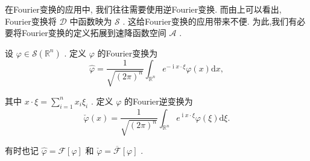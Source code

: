 \documentclass[lang=cn,newtx,10pt,scheme=chinese,thmcnt=chapter]{elegantbook}
\newcommand{\dif}{\mathrm{d}}
\newcommand{\ci}{\operatorname{i}}
\begin{document}
在Fourier变换的应用中, 我们往往需要使用逆Fourier变换. 而由上可以看出, Fourier变换将 \(\mathcal{D}\) 中函数映为 \(\mathcal{S}\) . 这给Fourier变换的应用带来不便. 为此,我们有必要将Fourier变换的定义拓展到速降函数空间 \(\mathcal{A}\) .
\begin{definition}
   设 \(\varphi  \in  \mathcal{S}\left( {\mathbb{R}}^{n}\right)\) . 定义 \(\varphi\) 的Fourier变换为
\begin{equation}
\widehat{\varphi } = \frac{1}{\sqrt{{\left( 2\pi \right) }^{n}}}{\int }_{{\mathbb{R}}^{n}}{e}^{-{\ci x} \cdot  \xi }\varphi \left( x\right) {\dif x}, \label{3.13}
\end{equation}

其中 \(x \cdot  \xi  = \mathop{\sum }\limits_{{i = 1}}^{n}{x}_{i}{\xi }_{i}\) . 定义 \(\varphi\) 的Fourier逆变换为\begin{equation*}
\check{\varphi }\left( x\right)  = \frac{1}{\sqrt{{\left( 2\pi \right) }^{n}}}{\int }_{{\mathbb{R}}^{n}}{e}^{{\ci x} \cdot  \xi }\varphi \left( \xi \right) {\dif\xi }.
\end{equation*}

有时也记 \(\widehat{\varphi } = \mathcal{F}\left\lbrack  \varphi \right\rbrack\) 和 \(\check{\varphi } = \overline{\mathcal{F}}\left\lbrack  \varphi \right\rbrack\) .
\end{definition}
\end{document}
